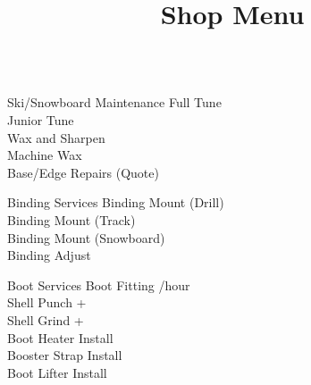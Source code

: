 \documentclass{beamer}
\title{Shop Menu}
\begin{document}
  \begin{frame}[fragile]\centering
    \begin{columns}[T]
        \begin{column}{0.95\textwidth}
            \begin{block}{Ski/Snowboard Maintenance}
                Full Tune \hfill {}\\
                Junior Tune \hfill {}\\
                Wax and Sharpen \hfill {}\\
                Machine Wax \hfill{}\\
                Base/Edge Repairs \hfill(Quote)
            \end{block}
             \begin{block}{Binding Services}
                Binding Mount (Drill) \hfill {}\\
                Binding Mount (Track) \hfill {}\\
                Binding Mount (Snowboard)\hfill {}\\
                Binding Adjust \hfill {}
            \end{block}
            \begin{block}{Boot Services}
                Boot Fitting \hfill {}/hour\\
                Shell Punch \hfill {}+\\
                Shell Grind \hfill {}+\\
                Boot Heater Install \hfill {}\\
                Booster Strap Install \hfill {}\\
                Boot Lifter Install \hfill {}
            \end{block}
        \end{column}
    \end{columns}
  \end{frame}
\end{document}
